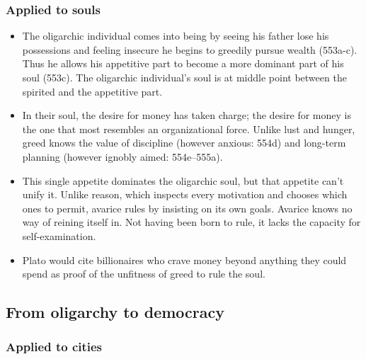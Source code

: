 \documentclass[oneside]{article}
\begin{document}
\subsubsection*{Applied to souls} 

\begin{itemize}
\item The oligarchic individual comes into being by seeing his father lose his
possessions and feeling insecure he begins to greedily pursue wealth
(553a-c). Thus he allows his appetitive part to become a more dominant
part of his soul (553c). The oligarchic individual's soul is at middle
point between the spirited and the appetitive part.
\item In their soul, the desire for money has taken charge; the desire for money is the one that most resembles an
organizational force. Unlike lust and hunger, greed knows the value of
discipline (however anxious: 554d) and long-term planning (however
ignobly aimed: 554e--555a). 
\item This single appetite dominates the oligarchic soul, but that appetite can't unify it. Unlike reason, which inspects
every motivation and chooses which ones to permit, avarice rules by
insisting on its own goals. Avarice knows no way of reining itself in. Not having been born to rule, it lacks the capacity for
self-examination. 
\item Plato would cite billionaires who crave money beyond
anything they could spend as proof of the unfitness of greed to rule
the soul.
\end{itemize}


\subsection*{From oligarchy to democracy}
\subsubsection*{Applied to cities} 
\end{document}
